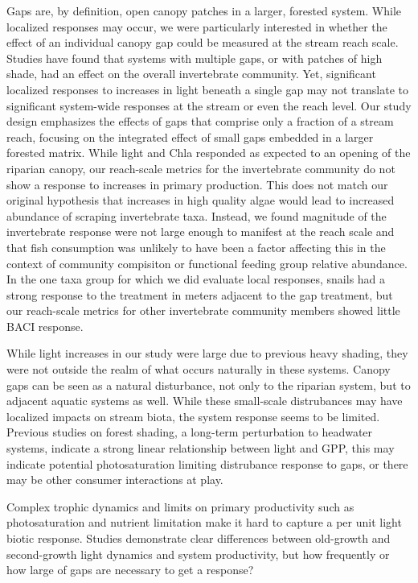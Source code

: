 \documentclass[double,12pt]{beavtex}
\begin{document}
  Gaps are, by definition, open canopy patches in a larger, forested
  system. While localized responses may occur, we were particularly
  interested in whether the effect of an individual canopy gap could be
  measured at the stream reach scale. Studies have found that systems with
  multiple gaps, or with patches of high shade, had an effect on the
  overall invertebrate community. Yet, significant localized responses to
  increases in light beneath a single gap may not translate to significant
  system-wide responses at the stream or even the reach level. Our study
  design emphasizes the effects of gaps that comprise only a fraction of a
  stream reach, focusing on the integrated effect of small gaps embedded
  in a larger forested matrix. While light and Chla responded as expected
  to an opening of the riparian canopy, our reach-scale metrics for the
  invertebrate community do not show a response to increases in primary
  production. This does not match our original hypothesis that increases
  in high quality algae would lead to increased abundance of scraping
  invertebrate taxa. Instead, we found magnitude of the invertebrate
  response were not large enough to manifest at the reach scale and that
  fish consumption was unlikely to have been a factor affecting this in
  the context of community compisiton or functional feeding group relative
  abundance. In the one taxa group for which we did evaluate local
  responses, snails had a strong response to the treatment in meters
  adjacent to the gap treatment, but our reach-scale metrics for other
  invertebrate community members showed little BACI response.
  
  While light increases in our study were large due to previous heavy
  shading, they were not outside the realm of what occurs naturally in
  these systems. Canopy gaps can be seen as a natural disturbance, not
  only to the riparian system, but to adjacent aquatic systems as well.
  While these small-scale distrubances may have localized impacts on
  stream biota, the system response seems to be limited. Previous studies
  on forest shading, a long-term perturbation to headwater systems,
  indicate a strong linear relationship between light and GPP, this may
  indicate potential photosaturation limiting distrubance response to
  gaps, or there may be other consumer interactions at play.
  
  Complex trophic dynamics and limits on primary productivity such as
  photosaturation and nutrient limitation make it hard to capture a per
  unit light biotic response. Studies demonstrate clear differences
  between old-growth and second-growth light dynamics and system
  productivity, but how frequently or how large of gaps are necessary to
  get a response?
  
\end{document}
